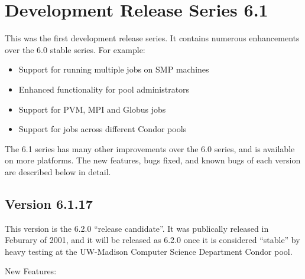 \section{\label{sec:History-6-1}Development Release Series 6.1}

This was the first development release series.
It contains numerous enhancements over the 6.0 stable series.
For example:

\begin{itemize}
\item Support for running multiple jobs on SMP machines
\item Enhanced functionality for pool administrators
\item Support for PVM, MPI and Globus jobs
\item Support for  jobs across different Condor pools
\end{itemize}

The 6.1 series has many other improvements over the 6.0 series, and  
is available on more platforms.  
The new features, bugs fixed, and known bugs of each version are
described below in detail.

\subsection{\label{sec:New-6-1-17}Version 6.1.17}

This version is the 6.2.0 ``release candidate''.  
It was publically released in Feburary of 2001, and it will be released
as 6.2.0 once it is considered ``stable'' by heavy testing at the 
UW-Madison Computer Science Department Condor pool.

\noindent New Features:


